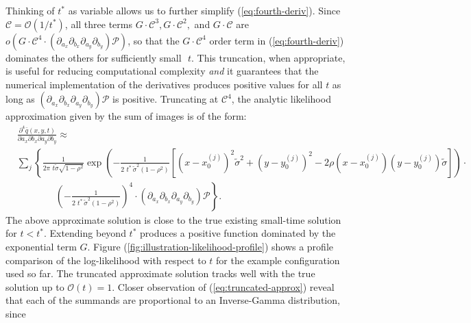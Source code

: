 \documentclass[10pt]{article}
\begin{document}
Thinking of $t^{*}$ as variable allows us to further simplify
(\ref{eq:fourth-deriv}). Since $\mathcal{C} = \mathcal{O}(1/t^{*})$,
all three terms $G\cdot \mathcal{C}^3, G\cdot \mathcal{C}^2,$ and
$G\cdot \mathcal{C}$ are
$o\left( G\cdot \mathcal{C}^4 \cdot \left(\partial_{a_x}\partial_{b_x}
    \partial_{a_y}\partial_{b_y} \right)\mathcal{P} \right)$, so that
the $G\cdot \mathcal{C}^4$ order term in (\ref{eq:fourth-deriv})
dominates the others for sufficiently small $\,\,t$. This truncation,
when appropriate, is useful for reducing computational complexity
\textit{and} it guarantees that the numerical implementation of the
derivatives produces positive values for all $t$ as long as
$\left(\partial_{a_x}\partial_{b_x} \partial_{a_y}\partial_{b_y}
\right)\mathcal{P}$ is positive. Truncating at $\mathcal{C}^4$, the
analytic likelihood approximation given by the sum of images is of the
form:
\begin{align}
  &\frac{\partial^4 \bar{q}(x, y, t)}{\partial a_x
  \partial b_x \partial a_y \partial b_y} \approx  & \nonumber \\
  &\sum_{j} \left\{ \frac{1}{2\pi\,\, t\tilde{\sigma}\sqrt{1-\rho^2}} \exp\left(
    -\frac{1}{2\,\,t^*\, \tilde{\sigma}^2 (1-\rho^2)} \left[
      \left(x-x_0^{(j)}\right)^2 \tilde{\sigma}^2 +
      \left(y-y_0^{(j)}\right)^2 -
      2\rho(x-x_0^{(j)})(y-y_0^{(j)})\tilde{\sigma} \right]\right)
    \cdot \right. & \nonumber \\
  &\qquad \qquad \left. \left( -\frac{1}{2\,\,t^*\, \tilde{\sigma}^2 (1-\rho^2)} \right)^4 \cdot \left(\partial_{a_x}\partial_{b_x}
    \partial_{a_y}\partial_{b_y} \right)\mathcal{P} \right\}. & \label{eq:truncated-approx}
\end{align}
The above approximate solution is close to the true existing
small-time solution for $t < t^*$. Extending beyond $t^*$ produces a
positive function dominated by the exponential term $G$. Figure
(\ref{fig:illustration-likelihood-profile}) shows a profile comparison
of the log-likelihood with respect to $t$ for the example
configuration used so far. The truncated approximate solution tracks
well with the true solution up to $\mathcal{O}(t) = 1$. Closer
observation of (\ref{eq:truncated-approx}) reveal that each of the
summands are proportional to an Inverse-Gamma distribution, since
\end{document}
